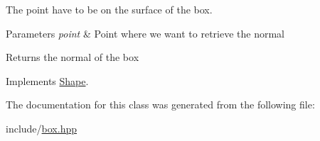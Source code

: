 The point have to be on the surface of the box.


\begin{DoxyParams}{Parameters}
{\em point} & Point where we want to retrieve the normal \\
\hline
\end{DoxyParams}
\begin{DoxyReturn}{Returns}
the normal of the box 
\end{DoxyReturn}


Implements \hyperlink{class_shape_a8444ffb396f26bd86c1c11bc6c47a74d}{Shape}.



The documentation for this class was generated from the following file\+:\begin{DoxyCompactItemize}
\item 
include/\hyperlink{box_8hpp}{box.\+hpp}\end{DoxyCompactItemize}
